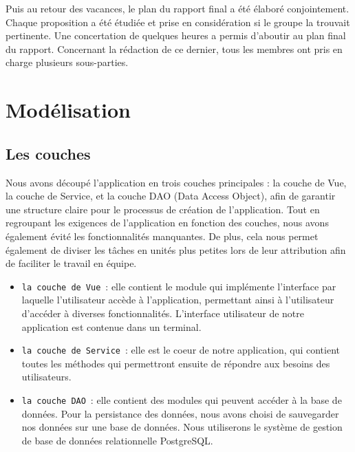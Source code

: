 \documentclass[11pt]{article}
\begin{document}
Puis au retour des vacances, le plan du rapport final a été élaboré conjointement. Chaque proposition a été étudiée et prise en considération si le groupe la trouvait pertinente. Une concertation de quelques heures a permis d’aboutir au plan final du rapport. Concernant la rédaction de ce dernier, tous les membres ont pris en charge plusieurs sous-parties.



\newpage
\section{Modélisation}

\subsection{Les couches}

Nous avons découpé l'application en trois couches principales : la couche de Vue, la couche de Service, et la couche DAO (Data Access Object), afin de garantir une structure claire pour le processus de création de l'application. Tout en regroupant les exigences de l'application en fonction des couches, nous avons également évité les fonctionnalités manquantes. De plus, cela nous permet également de diviser les tâches en unités plus petites lors de leur attribution afin de faciliter le travail en équipe.

\begin{itemize}
    \item \texttt{la couche de Vue}~: elle contient le module qui implémente l'interface par laquelle l'utilisateur accède à l'application, permettant ainsi à l'utilisateur d'accéder à diverses fonctionnalités. L'interface utilisateur de notre application est contenue dans un terminal.
    \item \texttt{la couche de Service}~:  elle est le coeur de notre application, qui contient toutes les méthodes qui permettront ensuite de répondre aux besoins des utilisateurs.
    \item \texttt{la couche DAO}~:  elle contient des modules qui peuvent accéder à la base de données. Pour la persistance des données, nous avons choisi de sauvegarder nos données sur une base de données. Nous utiliserons le système de gestion de base de données relationnelle PostgreSQL.\\
\end{itemize}
\end{document}
